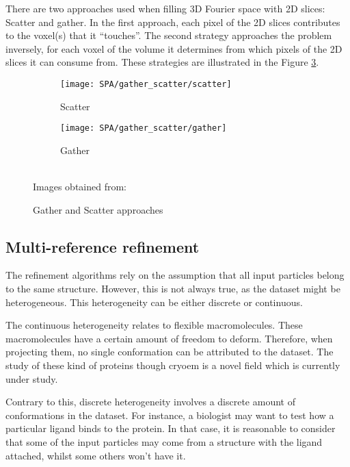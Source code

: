 \documentclass[../main.tex]{subfiles}
\begin{document}
There are two approaches used when filling 3D Fourier space with 2D slices: Scatter and gather. In the first approach, each pixel of the 2D slices contributes to the voxel(s) that it ``touches''. The second strategy approaches the problem inversely, for each voxel of the volume it determines from which pixels of the 2D slices it can consume from\cite{strelak2019}. These strategies are illustrated in the Figure \ref{fig:3:gather_scatter}.

\begin{figure}[htbp]
    \centering
    \begin{subfigure}[b]{0.45\textwidth}
         \centering
         \texttt{[image: SPA/gather\_scatter/scatter]}
         \caption{Scatter}
         \label{fig:4:gather_scatter:scatter}
    \end{subfigure}
    \begin{subfigure}[b]{0.45\textwidth}
         \centering
         \texttt{[image: SPA/gather\_scatter/gather]}
         \caption{Gather}
         \label{fig:4:gather_scatter:gather}
    \end{subfigure}\\
    Images obtained from: \cite{strelak2019}
    \caption{Gather and Scatter approaches}
    \label{fig:3:gather_scatter}
\end{figure}


\subsection{Multi-reference refinement}
The refinement algorithms rely on the assumption that all input particles belong to the same structure. However, this is not always true, as the dataset might be heterogeneous. This heterogeneity can be either discrete or continuous. 

The continuous heterogeneity relates to flexible macromolecules. These macromolecules have a certain amount of freedom to deform. Therefore, when projecting them, no single conformation can be attributed to the dataset. The study of these kind of proteins though \gls{cryoem} is a novel field which is currently under study\cite{herreros2021}.

Contrary to this, discrete heterogeneity involves a discrete amount of conformations in the dataset. For instance, a biologist may want to test how a particular ligand binds to the protein. In that case, it is reasonable to consider that some of the input particles may come from a structure with the ligand attached, whilst some others won't have it.
\end{document}
